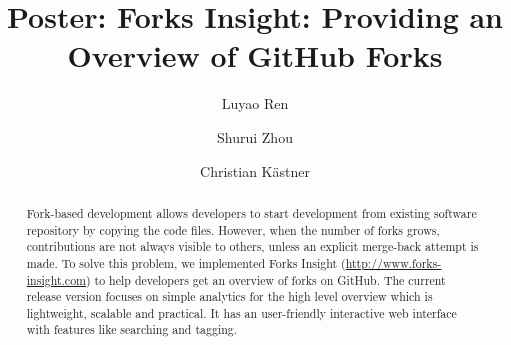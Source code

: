 \documentclass[sigconf]{acmart}
\begin{document}
\title{Poster: Forks Insight: Providing an Overview of GitHub Forks}

	\author{Luyao Ren}

	\author{Shurui Zhou}
	
	\author{Christian K\"{a}stner} 

	\iffalse
       \author{Andrzej W\k{a}sowski}
	\affiliation{%
		\institution{IT University of Copenhagen}
	}
	\fi


	\renewcommand{\shortauthors}{L. Ren et al.}
	

\begin{abstract}
Fork-based development allows developers to start development from existing software repository by copying the code files. However, when the number of forks grows, contributions are not always visible to others, unless an explicit merge-back attempt is made. To solve this problem, we implemented Forks Insight (\url{http://www.forks-insight.com}) to help developers get an overview of forks on GitHub. The current release version focuses on simple analytics for the high level overview which is lightweight, scalable and practical. It has an user-friendly interactive web interface with features like searching and tagging.

\end{abstract}



\maketitle



 
\end{document}
